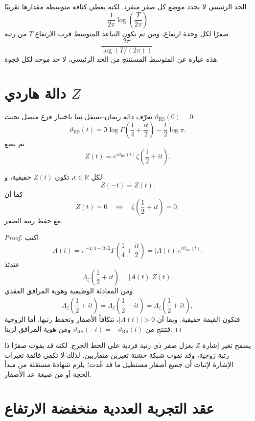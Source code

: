 الحد الرئيسي لا يحدد موضع كل صفر منفرد. لكنه يعطي كثافة متوسطة مقدارها
تقريبًا
\[
\frac{1}{2\pi}\log\!\left(\frac{T}{2\pi}\right)
\]
صفرًا لكل وحدة ارتفاع، ومن ثم يكون التباعد المتوسط قرب الارتفاع \(T\)
من رتبة
\[
\frac{2\pi}{\log(T/(2\pi))}.
\]
هذه عبارة عن المتوسط المستنتج من الحد الرئيسي، لا حد موحد لكل فجوة.

\section{دالة هاردي \(Z\)}

نعرّف دالة ريمان--سيغل ثيتا باختيار فرع متصل بحيث
\(\vartheta_{\mathrm{RS}}(0)=0\):
\[
\vartheta_{\mathrm{RS}}(t)
=
\Im\log\Gamma\!\left(\frac14+\frac{it}{2}\right)
-\frac{t}{2}\log\pi.
\]
ثم نضع
\[
Z(t)
=
e^{i\vartheta_{\mathrm{RS}}(t)}
\zeta\!\left(\frac12+it\right).
\]

\begin{proposition}
\label{prop:hardy-z-real}
\provedhere
لكل \(t\in\mathbb{R}\)، تكون \(Z(t)\) حقيقية، و
\[
Z(-t)=Z(t).
\]
كما أن
\[
Z(t)=0
\quad\Longleftrightarrow\quad
\zeta\!\left(\frac12+it\right)=0,
\]
مع حفظ رتبة الصفر.
\end{proposition}

\begin{proof}
اكتب
\[
A(t)
=
\pi^{-1/4-it/2}
\Gamma\!\left(\frac14+\frac{it}{2}\right)
=
|A(t)|e^{i\vartheta_{\mathrm{RS}}(t)}.
\]
عندئذ
\[
\Lambda_\zeta\!\left(\frac12+it\right)
=
|A(t)|Z(t).
\]
ومن المعادلة الوظيفية وهوية المرافق العقدي:
\[
\Lambda_\zeta\!\left(\frac12+it\right)
=
\Lambda_\zeta\!\left(\frac12-it\right)
=
\overline{
\Lambda_\zeta\!\left(\frac12+it\right)
},
\]
فتكون القيمة حقيقية. وبما أن \(|A(t)|>0\)، تتكافأ الأصفار وتحفظ
رتبها. أما الزوجية فتنتج من
\(\vartheta_{\mathrm{RS}}(-t)=-\vartheta_{\mathrm{RS}}(t)\)
ومن هوية المرافق لزيتا.
\end{proof}

يسمح تغير إشارة \(Z\) بعزل صفر ذي رتبة فردية على الخط الحرج. لكنه قد
يفوت صفرًا ذا رتبة زوجية، وقد تفوت شبكة خشنة تغيرين متقاربين. لذلك لا
تكفي قائمة تغيرات الإشارة لإثبات أن جميع أصفار مستطيل ما قد عُدت؛ يلزم
شهادة مستقلة من مبدأ الحجة أو من صيغة عد الأصفار.

\section{عقد التجربة العددية منخفضة الارتفاع}

